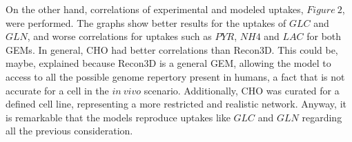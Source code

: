 	
	On the other hand, correlations of experimental and modeled uptakes, $Figure\ 2$, were performed. The graphs show better results for the uptakes of $GLC$ and $GLN$, 
	and worse correlations for uptakes such as $PYR$, $NH4$ and $LAC$ for both GEMs. In general, CHO had better correlations than Recon3D. This could be, maybe, explained because Recon3D is a general GEM, allowing the model to access to all the possible genome repertory present in humans, a fact that is not accurate for a cell in the $in\ vivo$ scenario. Additionally, CHO was curated for a defined cell line, representing a more restricted and realistic network. Anyway, it is remarkable that the models reproduce uptakes like $GLC$ and $GLN$ regarding all the previous consideration.